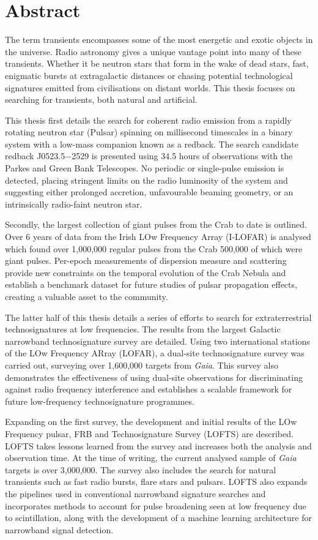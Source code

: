 \thispagestyle{empty}
\chapter*{Abstract}

The term transients encompasses some of the most energetic and exotic objects in the universe. Radio astronomy gives a unique vantage point into many of these transients. Whether it be neutron stars that form in the wake of dead stars, fast, enigmatic bursts at extragalactic distances or chasing potential technological signatures emitted from civilisations on distant worlds. This thesis focuses on searching for transients, both natural and artificial. 

This thesis first details the search for coherent radio emission from a rapidly rotating neutron star (Pulsar) spinning on millisecond timescales in a binary system with a low-mass companion known as a redback. The search candidate redback J0523.5$-$2529 is presented using 34.5 hours of observations with the Parkes and Green Bank Telescopes. No periodic or single-pulse emission is detected, placing stringent limits on the radio luminosity of the system and suggesting either prolonged accretion, unfavourable beaming geometry, or an intrinsically radio-faint neutron star.

Secondly, the largest collection of giant pulses from the Crab to date is outlined. Over 6 years of data from the Irish LOw Frequency Array (I-LOFAR) is analysed which found over 1,000,000 regular pulses from the Crab 500,000 of which were giant pulses. Per-epoch measurements of dispersion measure and scattering provide new constraints on the temporal evolution of the Crab Nebula and establish a benchmark dataset for future studies of pulsar propagation effects, creating a valuable asset to the community. 

The latter half of this thesis details a series of efforts to search for extraterrestrial technosignatures at low frequencies.  The results from the largest Galactic narrowband technosignature survey are detailed. Using two international stations of the LOw Frequency ARray (LOFAR), a dual-site technosignature survey was carried out, surveying over 1,600,000 targets from \textit{Gaia}. This survey also demonstrates the effectiveness of using dual-site observations for discriminating against radio frequency interference and establishes a scalable framework for future low‑frequency technosignature programmes.

Expanding on the first survey, the development and initial results of the LOw Frequency pulsar, FRB and Technosignature Survey (LOFTS) are described. LOFTS takes lessons learned from the survey and increases both the analysis and observation time. At the time of writing, the current analysed sample of  \textit{Gaia} targets is over 3,000,000. The survey also includes the search for natural transients such as fast radio bursts, flare stars and pulsars. LOFTS also expands the pipelines used in conventional narrowband signature searches and incorporates methods to account for pulse broadening seen at low frequency due to scintillation, along with the development of a machine learning architecture for narrowband signal detection. 

